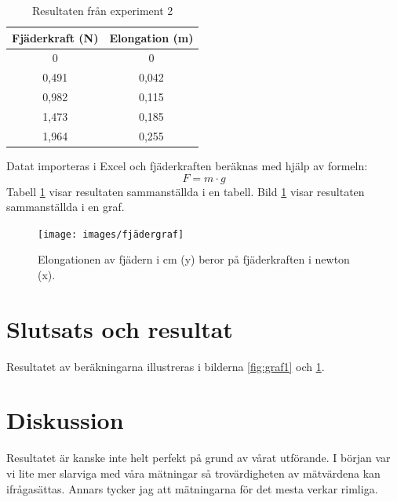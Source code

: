 \documentclass[11p, titlepage, oneside, a4paper]{article}
\begin{document}
\begin{table}
    \begin{center}
        \begin{tabular}{ |c|c| }
            \hline
            Fjäderkraft (N) & Elongation (m)  \\
            \hline
            0 & 0 \\
            0,491 & 0,042 \\
            0,982 & 0,115 \\
            1,473 & 0,185 \\
            1,964 & 0,255 \\
            \hline
        \end{tabular}
        \caption{Resultaten från experiment 2}
        \label{table:result2.1}
    \end{center}
\end{table}


        Datat importeras i Excel och fjäderkraften beräknas med hjälp av formeln:
        \begin{equation}
            F = {m}\cdot{g}
        \end{equation}
        Tabell \ref{table:result2.1} visar resultaten sammanställda i en tabell.
        Bild \ref{fig:graf2} visar resultaten sammanställda i en graf.

        \begin{figure}[!h]
            \texttt{[image: images/fjädergraf]}
            \caption{Elongationen av fjädern i cm (y) beror på fjäderkraften i newton (x).}
            \label{fig:graf2}
        \end{figure}
    
    \section{Slutsats och resultat} 
        Resultatet av beräkningarna illustreras i bilderna \ref{fig:graf1} och \ref{fig:graf2}.
    \section{Diskussion} 
    Resultatet är kanske inte helt perfekt på grund av vårat utförande. I början var vi lite mer slarviga med våra mätningar så trovärdigheten av mätvärdena kan ifrågasättas. Annars tycker jag att mätningarna för det mesta verkar rimliga.


    
    \printbibliography
\end{document}
